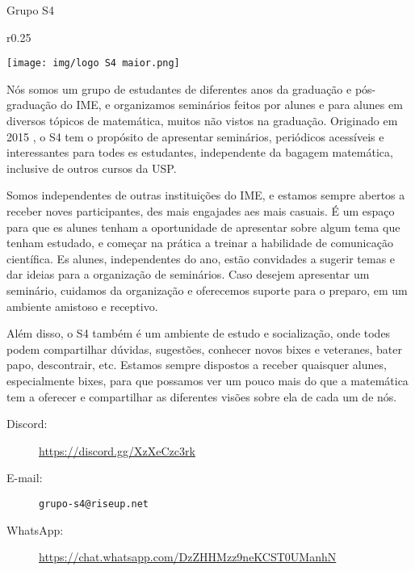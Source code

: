 \begin{subsecao}{Grupo S4}

\begin{wrapfigure}{r}{0.25\textwidth}
    \vspace{-25pt}
    \begin{center}
      \texttt{[image: img/logo S4 maior.png]}
    \end{center}
    \vspace{-25pt}
  \end{wrapfigure}


Nós somos um grupo de estudantes de diferentes anos da graduação e pós-graduação 
do IME, e organizamos seminários feitos por alunes e para alunes em diversos
tópicos de matemática, muitos não vistos na graduação. Originado em 2015 , o S4 tem
o propósito de apresentar seminários, periódicos acessíveis e interessantes para todes 
es estudantes, independente da bagagem matemática, inclusive de outros cursos da USP. 

Somos independentes de outras instituições do IME, e estamos sempre abertos a 
receber noves participantes, des mais engajades aes mais casuais. É um espaço
para que es alunes tenham a oportunidade de apresentar sobre algum tema que tenham
estudado, e começar na prática a treinar a habilidade de comunicação científica. 
Es alunes, independentes do ano, estão convidades a sugerir temas e dar ideias
para a organização de seminários. Caso desejem apresentar um seminário, cuidamos 
da organização e oferecemos suporte para o preparo, em um ambiente amistoso e receptivo.

Além disso, o S4 também é um ambiente de estudo e socialização, onde todes podem
compartilhar dúvidas, sugestões, conhecer novos bixes e veteranes, bater papo,
descontrair, etc. Estamos sempre dispostos a receber quaisquer alunes, especialmente
bixes, para que possamos ver um pouco mais do que a matemática tem a oferecer e
compartilhar as diferentes visões sobre ela de cada um de nós.

\begin{description}
  \item[Discord:] \url{https://discord.gg/XzXeCzc3rk}
  \item[E-mail:] {\tt grupo-s4@riseup.net}
  \item[WhatsApp:] \url{https://chat.whatsapp.com/DzZHHMzz9neKCST0UManhN}
\end{description}

\end{subsecao}
